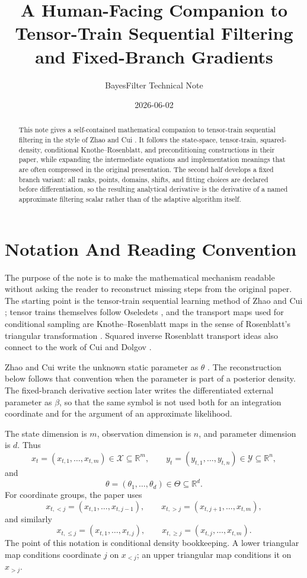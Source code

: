 \documentclass[11pt]{article}
\title{A Human-Facing Companion to Tensor-Train Sequential Filtering and Fixed-Branch Gradients}
\author{BayesFilter Technical Note}
\date{2026-06-02}
\newcommand{\R}{\mathbb R}
\begin{document}
\maketitle

\begin{abstract}
This note gives a self-contained mathematical companion to tensor-train
sequential filtering in the style of Zhao and Cui \cite{zhao2024ttsequential}.
It follows the state-space, tensor-train, squared-density, conditional
Knothe--Rosenblatt, and preconditioning constructions in their paper, while
expanding the intermediate equations and implementation meanings that are often
compressed in the original presentation.  The second half develops a fixed
branch variant: all ranks, points, domains, shifts, and fitting choices are
declared before differentiation, so the resulting analytical derivative is the
derivative of a named approximate filtering scalar rather than of the adaptive
algorithm itself.
\end{abstract}

\tableofcontents

\section{Notation And Reading Convention}

The purpose of the note is to make the mathematical mechanism readable without
asking the reader to reconstruct missing steps from the original paper.  The
starting point is the tensor-train sequential learning method of Zhao and Cui
\cite{zhao2024ttsequential}; tensor trains themselves follow Oseledets
\cite{oseledets2011tt}, and the transport maps used for conditional sampling
are Knothe--Rosenblatt maps in the sense of Rosenblatt's triangular
transformation \cite{rosenblatt1952remarks}.  Squared inverse Rosenblatt
transport ideas also connect to the work of Cui and Dolgov
\cite{cui2021deep}.

Zhao and Cui write the unknown static parameter as \(\theta\)
\cite{zhao2024ttsequential}.  The reconstruction below follows that convention
when the parameter is part of a posterior density.  The fixed-branch derivative
section later writes the differentiated external parameter as \(\beta\), so
that the same symbol is not used both for an integration coordinate and for the
argument of an approximate likelihood.

The state dimension is \(m\), observation dimension is \(n\), and parameter
dimension is \(d\).  Thus
\[
    x_t=(x_{t,1},\ldots,x_{t,m})\in\mathcal X\subseteq\R^m,
    \qquad
    y_t=(y_{t,1},\ldots,y_{t,n})\in\mathcal Y\subseteq\R^n,
\]
and
\[
    \theta=(\theta_1,\ldots,\theta_d)\in\Theta\subseteq\R^d.
\]
For coordinate groups, the paper uses
\[
    x_{t,<j}=(x_{t,1},\ldots,x_{t,j-1}),\qquad
    x_{t,>j}=(x_{t,j+1},\ldots,x_{t,m}),
    \label{eq:p24-n1}
\]
and similarly
\[
    x_{t,\le j}=(x_{t,1},\ldots,x_{t,j}),\qquad
    x_{t,\ge j}=(x_{t,j},\ldots,x_{t,m}).
    \label{eq:p24-n2}
\]
The point of this notation is conditional density bookkeeping.  A lower
triangular map conditions coordinate \(j\) on \(x_{<j}\); an upper triangular
map conditions it on \(x_{>j}\).
\end{document}
